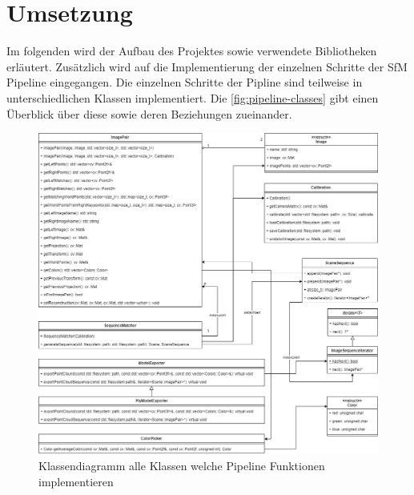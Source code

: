 \chapter{Umsetzung}\label{sec:implementation}
Im folgenden wird der Aufbau des Projektes sowie verwendete Bibliotheken erläutert.
Zusätzlich wird auf die Implementierung der einzelnen Schritte der SfM Pipeline eingegangen.
Die einzelnen Schritte der Pipline sind teilweise in unterschiedlichen Klassen implementiert.
Die \autoref{fig:pipeline-classes} gibt einen Überblick über diese sowie deren Beziehungen zueinander.

\begin{figure}
    \centering
    \includegraphics[width=\textwidth]{src/img/classes.jpg}
    \caption{Klassendiagramm alle Klassen welche Pipeline Funktionen implementieren}
    \label{fig:pipeline-classes}
\end{figure}








